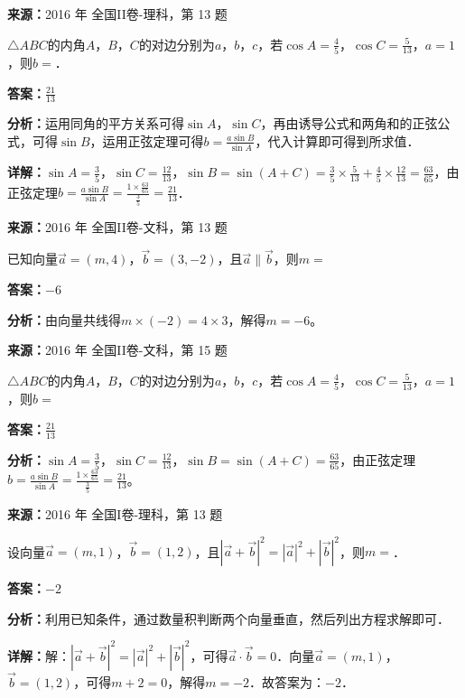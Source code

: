 \begin{question}[points=5]
\textbf{来源：}2016 年 全国II卷-理科，第 13 题\par
$\triangle ABC$的内角$A$，$B$，$C$的对边分别为$a$，$b$，$c$，若$\cos A=\frac{4}{5}$，$\cos C=\frac{5}{13}$，$a=1$，则$b=$．
\fillin[{$\frac{21}{13}$}]
\begin{solution}
\textbf{答案：}$\frac{21}{13}$

\textbf{分析：}运用同角的平方关系可得$\sin A$，$\sin C$，再由诱导公式和两角和的正弦公式，可得$\sin B$，运用正弦定理可得$b=\frac{a\sin B}{\sin A}$，代入计算即可得到所求值．

\textbf{详解：}$\sin A=\frac{3}{5}$，$\sin C=\frac{12}{13}$，$\sin B=\sin(A+C)=\frac{3}{5}\times\frac{5}{13}+\frac{4}{5}\times\frac{12}{13}=\frac{63}{65}$，由正弦定理$b=\frac{a\sin B}{\sin A}=\frac{1\times\frac{63}{65}}{\frac{3}{5}}=\frac{21}{13}$．
\end{solution}
\end{question}

\begin{question}[points=5]
\textbf{来源：}2016 年 全国II卷-文科，第 13 题\par
已知向量$\vec{a}=(m,4)$，$\vec{b}=(3,-2)$，且$\vec{a}\parallel\vec{b}$，则$m=$
\fillin[{$-6$}]
\begin{solution}
\textbf{答案：}$-6$

\textbf{分析：}由向量共线得$m\times(-2)=4\times3$，解得$m=-6$。
\end{solution}
\end{question}

\begin{question}[points=5]
\textbf{来源：}2016 年 全国II卷-文科，第 15 题\par
$\triangle ABC$的内角$A$，$B$，$C$的对边分别为$a$，$b$，$c$，若$\cos A=\frac{4}{5}$，$\cos C=\frac{5}{13}$，$a=1$，则$b=$
\fillin[{$\frac{21}{13}$}]
\begin{solution}
\textbf{答案：}$\frac{21}{13}$

\textbf{分析：}$\sin A=\frac{3}{5}$，$\sin C=\frac{12}{13}$，$\sin B=\sin(A+C)=\frac{63}{65}$，由正弦定理$b=\frac{a\sin B}{\sin A}=\frac{1\times\frac{63}{65}}{\frac{3}{5}}=\frac{21}{13}$。
\end{solution}
\end{question}

\begin{question}[points=5]
\textbf{来源：}2016 年 全国I卷-理科，第 13 题\par
设向量$\vec{a}=(m,1)$，$\vec{b}=(1,2)$，且$|\vec{a}+\vec{b}|^2=|\vec{a}|^2+|\vec{b}|^2$，则$m=$．
\fillin[{$-2$}]
\begin{solution}
\textbf{答案：}$-2$

\textbf{分析：}利用已知条件，通过数量积判断两个向量垂直，然后列出方程求解即可．

\textbf{详解：}解：$|\vec{a}+\vec{b}|^2=|\vec{a}|^2+|\vec{b}|^2$，可得$\vec{a}\cdot\vec{b}=0$．向量$\vec{a}=(m,1)$，$\vec{b}=(1,2)$，可得$m+2=0$，解得$m=-2$．故答案为：$-2$．
\end{solution}
\end{question}

